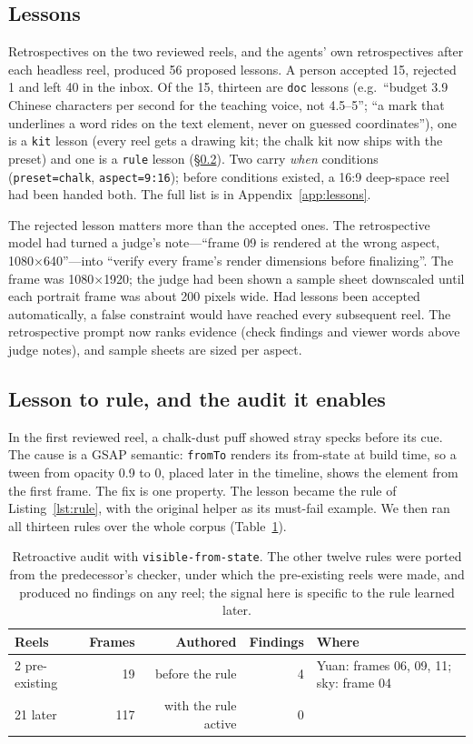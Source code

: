 \documentclass[11pt]{article}
\begin{document}
\subsection{Lessons}
\label{sec:lessons}
Retrospectives on the two reviewed reels, and the agents' own retrospectives after each headless
reel, produced 56 proposed lessons. A person accepted 15, rejected 1 and left 40 in the inbox. Of the
15, thirteen are \texttt{doc} lessons (e.g.\ ``budget 3.9 Chinese characters per second for the
teaching voice, not 4.5--5''; ``a mark that underlines a word rides on the text element, never on
guessed coordinates''), one is a \texttt{kit} lesson (every reel gets a drawing kit; the chalk kit now
ships with the preset) and one is a \texttt{rule} lesson (\S\ref{sec:audit}). Two carry \emph{when}
conditions (\texttt{preset=chalk}, \texttt{aspect=9:16}); before conditions existed, a 16:9
deep-space reel had been handed both. The full list is in Appendix~\ref{app:lessons}.

The rejected lesson matters more than the accepted ones. The retrospective model had turned a judge's
note---``frame 09 is rendered at the wrong aspect, 1080$\times$640''---into ``verify every frame's
render dimensions before finalizing''. The frame was 1080$\times$1920; the judge had been shown a
sample sheet downscaled until each portrait frame was about 200 pixels wide. Had lessons been
accepted automatically, a false constraint would have reached every subsequent reel. The
retrospective prompt now ranks evidence (check findings and viewer words above judge notes), and sample
sheets are sized per aspect.

\subsection{Lesson to rule, and the audit it enables}
\label{sec:audit}
In the first reviewed reel, a chalk-dust puff showed stray specks before its cue. The cause is a GSAP
semantic: \texttt{fromTo} renders its from-state at build time, so a tween from opacity 0.9 to 0,
placed later in the timeline, shows the element from the first frame. The fix is one property. The
lesson became the rule of Listing~\ref{lst:rule}, with the original helper as its must-fail example.
We then ran all thirteen rules over the whole corpus (Table~\ref{tab:audit}).

\begin{table}[t]
\centering\small
\begin{tabular}{lrrrl}
\toprule
Reels & Frames & Authored & Findings & Where \\
\midrule
2 pre-existing & 19 & before the rule & 4 & Yuan: frames 06, 09, 11; sky: frame 04 \\
21 later & 117 & with the rule active & 0 & \\
\bottomrule
\end{tabular}
\caption{Retroactive audit with \texttt{visible-from-state}. The other twelve rules were ported from
the predecessor's checker, under which the pre-existing reels were made, and produced no findings on
any reel; the signal here is specific to the rule learned later.}
\label{tab:audit}
\end{table}
\end{document}
